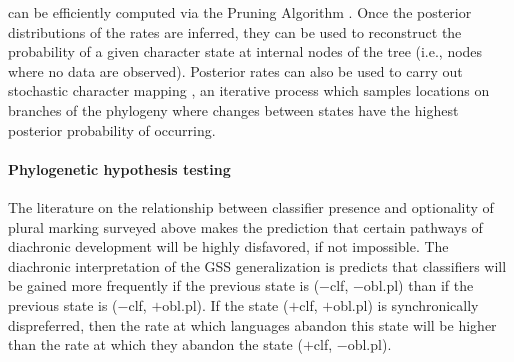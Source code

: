\documentclass[11pt]{article}
\begin{document}
can be efficiently computed via the Pruning Algorithm \citep[251--5]{Felsenstein2004}. 
Once the posterior distributions of the rates are inferred, they can be used to reconstruct the probability of a given character state at internal nodes of the tree (i.e., nodes where no data are observed). %
Posterior rates can also be used to carry out stochastic character mapping \citep[SCM;][]{Nielsen2002,Huelsenbecketal2003,Bollback2006}, an iterative process which samples locations on branches of the phylogeny where changes between states have the highest posterior probability of occurring. 



\paragraph{Phylogenetic hypothesis testing}

The literature on the relationship between classifier presence and optionality of plural marking surveyed above makes the prediction that certain pathways of diachronic development will be highly disfavored, if not impossible. 
The diachronic interpretation of the GSS generalization is predicts that classifiers will be gained more frequently if the previous state is {\sc ($-$clf, $-$obl.pl)} than if the previous state is {\sc ($-$clf, $+$obl.pl)}. 
If the state {\sc ($+$clf, $+$obl.pl)} is synchronically dispreferred, then the rate at which languages abandon this state will be higher than the rate at which they abandon the state {\sc ($+$clf, $-$obl.pl)}.
\end{document}
